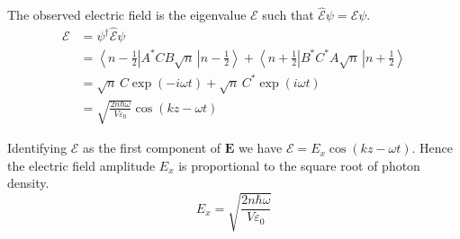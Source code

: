 \documentclass[12pt]{article}
\begin{document}
\noindent
The observed electric field is the eigenvalue $\mathscr{E}$ such that $\hat{\mathscr{E}}\psi=\mathscr{E}\psi$.
\begin{align*}
\mathscr{E}
&=\psi^\dagger\hat{\mathscr{E}}\psi\\
&=\left\langle n-\tfrac{1}{2}\right|A^*CB\sqrt{n}\,\left|n-\tfrac{1}{2}\right\rangle
+\left\langle n+\tfrac{1}{2}\right|B^*C^*A\sqrt{n}\,\left|n+\tfrac{1}{2}\right\rangle\\
&=\sqrt{n}\,C\exp(-i\omega t)+\sqrt{n}\,C^*\exp(i\omega t)\\
&=\sqrt{\frac{2n\hbar\omega}{V\varepsilon_0}}\cos(kz-\omega t)
\end{align*}

\noindent
Identifying $\mathscr{E}$ as the first component of $\mathbf{E}$ we have $\mathscr{E}=E_x\cos(kz-\omega t)$.
Hence the electric field amplitude $E_x$ is proportional to the square root of photon density.
$$
E_x=\sqrt{\frac{2n\hbar\omega}{V\varepsilon_0}}
$$
\end{document}
